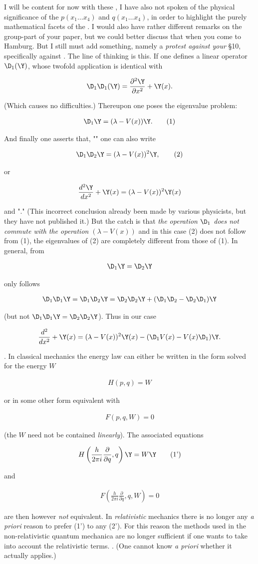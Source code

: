 \documentclass{article}
\newcommand{\nequ}[2]{
\begin{align*}
#1
\tag{#2}
\end{align*}
}
\newcommand{\uequ}[1]{
\begin{align*}
#1
\end{align*}
}
\begin{document}
I will be content for now with these , I have also not spoken of the physical significance of the $p(x_1\dots x_4)$ and $q(x_1 \dots x_4)$, in order to highlight the purely mathematical facets of the . I would also have rather different remarks on the group-part of your paper, but we could better discuss that when you come to Hamburg. But I still must add something, namely a \textit{protest against your} §10, specifically against . The line of thinking is this. If one defines a linear operator $\D_1(\Y)$, whose twofold application is identical with
\uequ{
\D_1 \D_1(\Y) = \frac{\partial^2 \Y}{\partial x^2} + \Y(x).
}
(Which causes no difficulties.) Thereupon one poses the eigenvalue problem:
\nequ{
\D_1 \Y = (\lambda - V(x))\Y.
}{1}
And finally one asserts that, "" one can also write
\nequ{
\D_1 \D_2 \Y = (\lambda - V(x))^2 \Y,
}{2}
or
\uequ{
\frac{d^2 \Y}{dx^2} + \Y(x) = (\lambda - V(x))^2 \Y(x)
}
and "." (This incorrect conclusion already been made by various physicists, but they have not published it.) But the catch is that \textit{the operation $\D_1$ does not commute with the operation $(\lambda - V(x))$} and in this case (2) does not follow from (1), the eigenvalues of (2) are completely different from those of (1). In general, from
\uequ{
\D_1 \Y = \D_2 \Y
}
only follows
\uequ{
\D_1 \D_1 \Y = \D_1 \D_2 \Y = \D_2 \D_2 \Y + (\D_1 \D_2 - \D_2 \D_1)\Y
}
(but not $\D_1 \D_1 \Y = \D_2 \D_2 \Y$). Thus in our case
\uequ{
\frac{d^2}{dx^2} + \Y(x) = (\lambda - V(x))^2 \Y(x) - (\D_1 V(x) - V(x) \D_1)\Y.
}
. In classical mechanics the energy law can either be written in the form solved for the energy $W$
\nequ{
H(p,q)=W
}{1}
or in some other form equivalent with
\nequ{
F(p,q,W) = 0
}{2}
(the $W$ need not be contained \textit{linearly}). The associated equations
\nequ{
H\left(\frac{h}{2\pi i}\frac{\partial}{\partial q}, q\right)\Y = W\Y
}{1'}
and
\nequ{
F\left(\frac{h}{2\pi i} \frac{\partial}{\partial q}, q, W\right) = 0
}{2'}
are then however \textit{not} equivalent. In \textit{relativistic} mechanics there is no longer any \textit{a priori} reason to prefer (1') to any (2'). For this reason the methods used in the non-relativistic quantum mechanica are no longer sufficient if one wants to take into account the relativistic terms. . (One cannot know \textit{a priori} whether it actually applies.)
\end{document}
